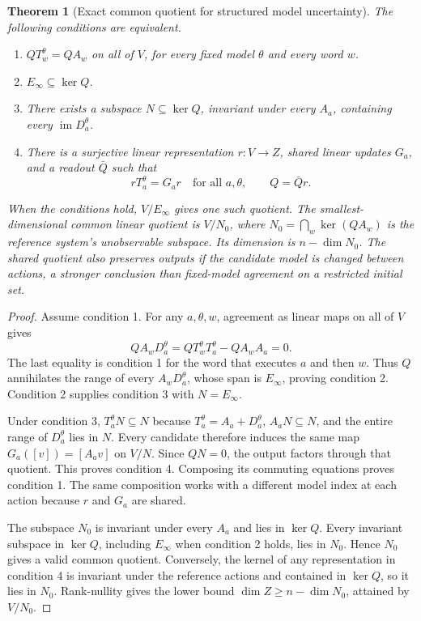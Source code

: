 \documentclass[11pt,letterpaper]{article}
\theoremstyle{plain}
\newtheorem{theorem}{Theorem}[section]
\theoremstyle{definition}
\newcommand{\im}{\operatorname{im}}\newcommand{\supp}{\operatorname{supp}}
\begin{document}
\begin{theorem}[Exact common quotient for structured model uncertainty]\label{thm:commonquotient}
The following conditions are equivalent.
\begin{enumerate}
\item $QT_w^\theta=QA_w$ on all of $V$, for every fixed model $\theta$ and every word $w$.
\item $E_\infty\subseteq\ker Q$.
\item There exists a subspace $N\subseteq\ker Q$, invariant under every $A_a$, containing every $\im D_a^\theta$.
\item There is a surjective linear representation $r:V\to Z$, shared linear updates $G_a$, and a readout $\bar Q$ such that
\[
rT_a^\theta=G_ar\quad\text{for all }a,\theta,\qquad Q=\bar Qr.
\]
\end{enumerate}
When the conditions hold, $V/E_\infty$ gives one such quotient. The smallest-dimensional common linear quotient is $V/N_0$, where $N_0=\bigcap_w\ker(QA_w)$ is the reference system's unobservable subspace. Its dimension is $n-\dim N_0$. The shared quotient also preserves outputs if the candidate model is changed between actions, a stronger conclusion than fixed-model agreement on a restricted initial set.
\end{theorem}
\begin{proof}
Assume condition 1. For any $a,\theta,w$, agreement as linear maps on all of $V$ gives
\[
QA_wD_a^\theta
=QT_w^\theta T_a^\theta-QA_wA_a=0.
\]
The last equality is condition 1 for the word that executes $a$ and then $w$. Thus $Q$ annihilates the range of every $A_wD_a^\theta$, whose span is $E_\infty$, proving condition 2. Condition 2 supplies condition 3 with $N=E_\infty$.

Under condition 3, $T_a^\theta N\subseteq N$ because $T_a^\theta=A_a+D_a^\theta$, $A_aN\subseteq N$, and the entire range of $D_a^\theta$ lies in $N$. Every candidate therefore induces the same map $G_a([v])=[A_av]$ on $V/N$. Since $QN=0$, the output factors through that quotient. This proves condition 4. Composing its commuting equations proves condition 1. The same composition works with a different model index at each action because $r$ and $G_a$ are shared.

The subspace $N_0$ is invariant under every $A_a$ and lies in $\ker Q$. Every invariant subspace in $\ker Q$, including $E_\infty$ when condition 2 holds, lies in $N_0$. Hence $N_0$ gives a valid common quotient. Conversely, the kernel of any representation in condition 4 is invariant under the reference actions and contained in $\ker Q$, so it lies in $N_0$. Rank-nullity gives the lower bound $\dim Z\ge n-\dim N_0$, attained by $V/N_0$.
\end{proof}
\end{document}

